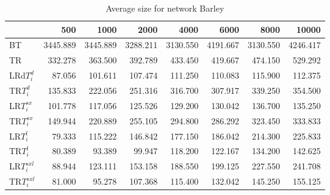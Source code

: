 \begin{table}
\begin{center}
\begin{tabular}{lrrrrrrr}
 & 500 &  1000 & 2000 & 4000 & 6000& 8000&  10000\\\hline
BT & 3445.889 & 3445.889 & 3288.211 & 3130.550 & 4191.667 & 3130.550 & 4246.417\\\hline
TR & 332.278 & 363.500 & 392.789 & 433.450 & 419.667 & 474.150 & 529.292\\\hline
LRd$T_i^d$ & 87.056 & 101.611 & 107.474 & 111.250 & 110.083 & 115.900 & 112.375\\\hline
TR$T_i^d$ & 135.833 & 222.056 & 251.316 & 316.700 & 307.917 & 339.250 & 354.500\\\hline
LR$T_i^{sx}$ & 101.778 & 117.056 & 125.526 & 129.200 & 130.042 & 136.700 & 135.250\\\hline
TR$T_i^{sx}$ & 149.944 & 220.889 & 255.105 & 294.800 & 286.292 & 323.450 & 333.833\\\hline
LR$T_i^l$ & 79.333 & 115.222 & 146.842 & 177.150 & 186.042 & 214.300 & 225.833\\\hline
TR$T_i^l$ & 80.389 & 93.389 & 99.947 & 118.200 & 122.167 & 134.200 & 142.625\\\hline
LR$T_i^{sxl}$ & 88.944 & 123.111 & 153.158 & 188.550 & 199.125 & 227.550 & 241.708\\\hline
TR$T_i^{sxl}$ & 81.000 & 95.278 & 107.368 & 115.400 & 132.042 & 145.250 & 155.125\\\hline
\end{tabular}
\end{center}
\caption{Average size for network Barley }
\label{Barleysi}
\end{table}

